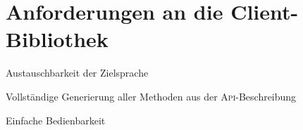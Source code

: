 
\section{Anforderungen an die Client-Bibliothek}
\label{item:requirements}

\begin{compactitem}
    \item Austauschbarkeit der Zielsprache
    \item Vollständige Generierung aller Methoden aus der \textsc{Api}-Beschreibung
    \item Einfache Bedienbarkeit
\end{compactitem}